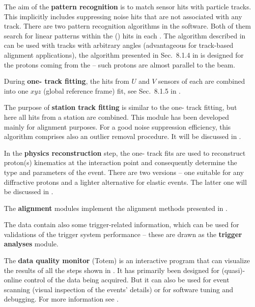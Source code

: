\> The aim of the {\bf pattern recognition} is to match sensor hits with particle tracks. This implicitly includes suppressing noise hits that are not associated with any track. There are two pattern recognition algorithms in the  software. Both of them search for linear patterns within the () hits in each . The algorithm described in  can be used with tracks with arbitrary angles (advantageous for track-based alignment applications), the algorithm presented in Sec.~8.1.4 in  is designed for the protons coming from the  -- such protons are almost parallel to the beam.

\> During {\bf one- track fitting}, the hits from $U$ and $V$ sensors of each  are combined into one $xyz$ (global reference frame) fit, see Sec.~8.1.5 in .

\> The purpose of {\bf station track fitting} is similar to the one- track fitting, but here all hits from a station are combined. This module has been developed mainly for alignment purposes. For a good noise suppression efficiency, this algorithm comprises also an outlier removal procedure. It will be discussed in .

\> In the {\bf physics reconstruction} step, the one- track fits are used to reconstruct proton(s) kinematics at the interaction point and consequently determine the type and parameters of the event. There are two versions -- one suitable for any diffractive protons and a lighter alternative for elastic events. The latter one will be discussed in .

\> The {\bf alignment} modules implement the  alignment methods presented in .

\> The  data contain also some trigger-related information, which can be used for validations of the trigger system performance -- these are drawn as the {\bf trigger analyses} module.

\> The {\bf data quality monitor} (Totem) is an interactive program that can visualize the results of all the steps shown in . It has primarily been designed for (quasi)-online control of the data being acquired. But it can also be used for event scanning (visual inspection of the events' details) or for software tuning and debugging. For more information see .



